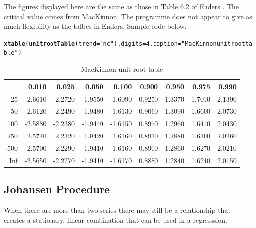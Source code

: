 \documentclass{article}\usepackage{graphicx, color}
\makeatletter
\newcommand{\hlfunctioncall}[1]{\textcolor[rgb]{0.501960784313725,0,0.329411764705882}{\textbf{#1}}}%
\newcommand{\hlstring}[1]{\textcolor[rgb]{0.6,0.6,1}{#1}}%
\newenvironment{kframe}{%
 \def\at@end@of@kframe{}%
 \ifinner\ifhmode%
  \def\at@end@of@kframe{\end{minipage}}%
  \begin{minipage}{\columnwidth}%
 \fi\fi%
 \def\FrameCommand##1{\hskip\@totalleftmargin \hskip-\fboxsep
 \colorbox{shadecolor}{##1}\hskip-\fboxsep
     \hskip-\linewidth \hskip-\@totalleftmargin \hskip\columnwidth}%
 \MakeFramed {\advance\hsize-\width
   \@totalleftmargin\z@ \linewidth\hsize
   \@setminipage}}%
 {\par\unskip\endMakeFramed%
 \at@end@of@kframe}
\makeatother
\begin{document}
The figures displayed here are the same as those in Table 6.2 of Enders \citep[p. 379]{EndersTS}.  The critical value comes from MacKinnon.  The programme does not appear to give as much flexibility as the talbes in Enders.  Sample code below. 
\begin{kframe}
\begin{alltt}
\hlfunctioncall{xtable}(\hlfunctioncall{unitrootTable}(trend = \hlstring{"nc"}), digits = 4, caption = \hlstring{"MacKinnon unit root table"})
\end{alltt}
\end{kframe}%
\begin{table}[ht]
\begin{center}
\begin{tabular}{rrrrrrrrr}
  \hline
 & 0.010 & 0.025 & 0.050 & 0.100 & 0.900 & 0.950 & 0.975 & 0.990 \\ 
  \hline
 25 & -2.6610 & -2.2720 & -1.9550 & -1.6090 & 0.9250 & 1.3370 & 1.7010 & 2.1390 \\ 
   50 & -2.6120 & -2.2490 & -1.9480 & -1.6130 & 0.9060 & 1.3090 & 1.6600 & 2.0730 \\ 
  100 & -2.5880 & -2.2380 & -1.9440 & -1.6150 & 0.8970 & 1.2960 & 1.6410 & 2.0430 \\ 
  250 & -2.5740 & -2.2320 & -1.9420 & -1.6160 & 0.8910 & 1.2880 & 1.6300 & 2.0260 \\ 
  500 & -2.5700 & -2.2290 & -1.9410 & -1.6160 & 0.8900 & 1.2860 & 1.6270 & 2.0210 \\ 
  Inf & -2.5650 & -2.2270 & -1.9410 & -1.6170 & 0.8880 & 1.2840 & 1.6240 & 2.0150 \\ 
   \hline
\end{tabular}
\caption{MacKinnon unit root table}
\end{center}
\end{table}



\subsection{Johansen Procedure}
When there are more than two series there may still be a relationship that creates a stationary, linear combination that can be used in a regresssion.  
\end{document}
